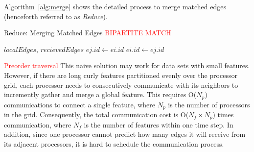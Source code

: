 \documentclass[10pt, conference, compsocconf]{IEEEtran}
\begin{document}
Algorithm~\ref{alg:merge} shows the detailed process to merge matched edges (henceforth referred to as \emph{Reduce}).
\begin{algorithm}
\caption{Reduce: Merging Matched Edges \textcolor{red}{BIPARTITE MATCH}}
\label{alg:merge}
\begin{algorithmic}[1]
\REQUIRE $localEdges$, $recievedEdges$
				\STATE $ej.id \leftarrow ei.id$
			\ELSE
				\STATE $ei.id \leftarrow ej.id$
			\ENDIF
		\ENDIF
	\ENDFOR	
\ENDFOR	
\end{algorithmic}
\end{algorithm}
\textcolor{red}{Preorder traversal}
This naive solution may work for data sets with small features. However, if there are long curly features partitioned evenly over the processor grid, each processor needs to consecutively communicate with its neighbors to incremently gather and merge a global feature. This requires O(${N_p}$) communications to connect a single feature, where ${N_p}$ is the number of processors in the grid. Consequently, the total communication cost is O(${N_f \times N_p}$) times communication, where ${N_f}$ is the number of features within one time step. In addition, since one processor cannot predict how many edges it will receive from its adjacent processors, it is hard to schedule the communication process.
\end{document}

